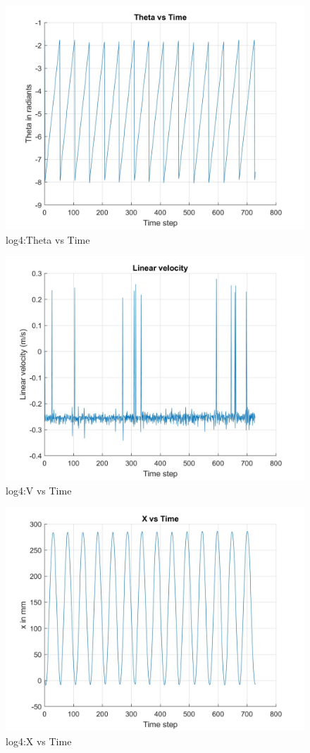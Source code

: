 \documentclass[paper=a4, fontsize=11pt]{scrartcl} %
\numberwithin{equation}{section} %
\numberwithin{figure}{section} %
\numberwithin{table}{section} %
\begin{document}
\begin{appendix}
\begin{figure}[H]
	\centering
	\includegraphics[width = 0.6\linewidth]{./figures/log4/thetaVsTime.jpg}
	\caption{log4:Theta vs Time}
\end{figure}

\begin{figure}[H]
	\centering
	\includegraphics[width = 0.6\linewidth]{./figures/log4/vVsTime.jpg}
	\caption{log4:V vs Time}
\end{figure}

\begin{figure}[H]
	\centering
	\includegraphics[width = 0.6\linewidth]{./figures/log4/xVsTime.jpg}
	\caption{log4:X vs Time}
\end{figure}


\end{appendix}
\end{document}
